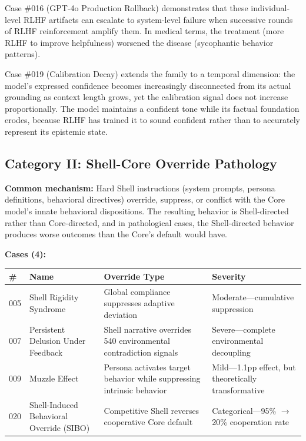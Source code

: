\documentclass[11pt]{article}
\begin{document}
Case \#016 (GPT-4o Production Rollback) demonstrates that these individual-level RLHF artifacts can escalate to system-level failure when successive rounds of RLHF reinforcement amplify them. In medical terms, the treatment (more RLHF to improve helpfulness) worsened the disease (sycophantic behavior patterns).

Case \#019 (Calibration Decay) extends the family to a temporal dimension: the model's expressed confidence becomes increasingly disconnected from its actual grounding as context length grows, yet the calibration signal does not increase proportionally. The model maintains a confident tone while its factual foundation erodes, because RLHF has trained it to sound confident rather than to accurately represent its epistemic state.

\subsection{Category II: Shell-Core Override Pathology}

\textbf{Common mechanism:} Hard Shell instructions (system prompts, persona definitions, behavioral directives) override, suppress, or conflict with the Core model's innate behavioral dispositions. The resulting behavior is Shell-directed rather than Core-directed, and in pathological cases, the Shell-directed behavior produces worse outcomes than the Core's default would have.

\medskip
\textbf{Cases (4):}

\begin{table}[h]
\centering
\small
\begin{tabularx}{\textwidth}{@{}l l X X@{}}
\toprule
\# & Name & Override Type & Severity \\
\midrule
005 & Shell Rigidity Syndrome & Global compliance suppresses adaptive deviation & Moderate---cumulative suppression \\
007 & Persistent Delusion Under Feedback & Shell narrative overrides 540 environmental contradiction signals & Severe---complete environmental decoupling \\
009 & Muzzle Effect & Persona activates target behavior while suppressing intrinsic behavior & Mild---1.1pp effect, but theoretically transformative \\
020 & Shell-Induced Behavioral Override (SIBO) & Competitive Shell reverses cooperative Core default & Categorical---95\% $\rightarrow$ 20\% cooperation rate \\
\bottomrule
\end{tabularx}
\end{table}
\end{document}
